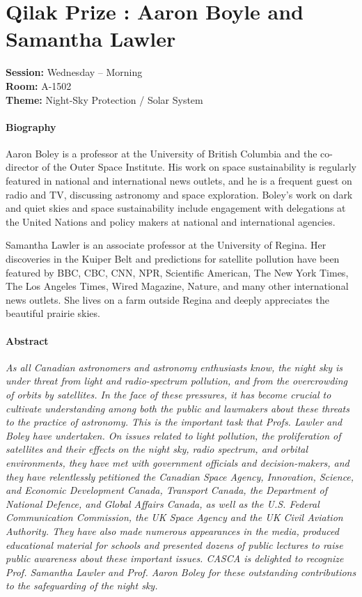 \section{Qilak Prize : Aaron Boyle and Samantha Lawler}
\textbf{Session:} {Wednesday -- Morning}\\
\textbf{Room:} A-1502\\
\textbf{Theme:} Night-Sky Protection / Solar System\\

\paragraph{Biography}
{\sffamily


Aaron Boley is a professor at the University of British Columbia and the co-director of the Outer Space Institute. His work on space sustainability is regularly featured in national and international news outlets, and he is a frequent guest on radio and TV, discussing astronomy and space exploration. Boley’s work on dark and quiet skies and space sustainability include engagement with delegations at the United Nations and policy makers at national and international agencies.

Samantha Lawler is an associate professor at the University of Regina. Her discoveries in the Kuiper Belt and predictions for satellite pollution have been featured by BBC, CBC, CNN, NPR, Scientific American, The New York Times, The Los Angeles Times, Wired Magazine, Nature, and many other international news outlets. She lives on a farm outside Regina and deeply appreciates the beautiful prairie skies.
}

\paragraph{Abstract}
{\itshape
As all Canadian astronomers and astronomy enthusiasts know, the night sky is under threat from light and radio-spectrum pollution, and from the overcrowding of orbits by satellites. In the face of these pressures, it has become crucial to cultivate understanding among both the public and lawmakers about these threats to the practice of astronomy. This is the important task that Profs. Lawler and Boley have undertaken. On issues related to light pollution, the proliferation of satellites and their effects on the night sky, radio spectrum, and orbital environments, they have met with government officials and decision-makers, and they have relentlessly petitioned the Canadian Space Agency, Innovation, Science, and Economic Development Canada, Transport Canada, the Department of National Defence, and Global Affairs Canada, as well as the U.S. Federal Communication Commission, the UK Space Agency and the UK Civil Aviation Authority. They have also made numerous appearances in the media, produced educational material for schools and presented dozens of public lectures to raise public awareness about these important issues.
CASCA is delighted to recognize Prof. Samantha Lawler and Prof. Aaron Boley for these outstanding contributions to the safeguarding of the night sky.
}
